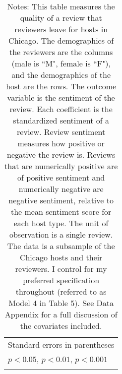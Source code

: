 \begin{landscape}
{\begin{longtable}{l*{8}{c}}
\hline\hline
\multicolumn{9}{l}{\footnotesize Standard errors in parentheses}\\
\multicolumn{9}{l}{\footnotesize \sym{*} \(p<0.05\), \sym{**} \(p<0.01\), \sym{***} \(p<0.001\)}\\
\caption*{Notes: This table measures the quality of a review that reviewers leave for hosts in Chicago. The demographics of the reviewers are the columns (male is ``M", female is ``F"), and the demographics of the host are the rows. The outcome variable is the sentiment of the review. Each coefficient is the standardized sentiment of a review. Review sentiment measures how positive or negative the review is. Reviews that are numerically positive are of positive sentiment and numerically negative are negative sentiment, relative to the mean sentiment score for each host type. The unit of observation is a single review. The data is a subsample of the Chicago hosts and their reviewers. I control for my preferred specification throughout (referred to as Model 4 in Table 5). See Data Appendix for a full discussion of the covariates included.}
\end{longtable}
}

\end{landscape}

\normalsize
